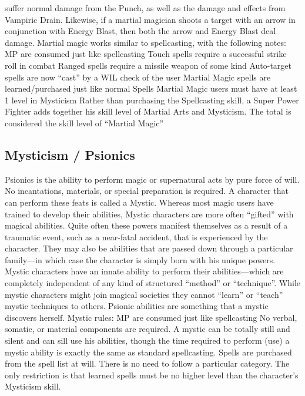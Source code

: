 \documentclass[twoside]{book}
\begin{document}
               suffer normal damage from the Punch, as well as the damage
               and effects from Vampiric Drain. Likewise, if a martial
               magician shoots a target with an arrow in conjunction with
               Energy Blast, then both the arrow and Energy Blast deal
               damage.   Martial magic works similar to spellcasting, with
               the following notes:   
                MP are consumed just like spellcasting   
                  Touch spells require a successful strike roll in
                 combat 
                  Ranged spells require a missile weapon of some
                 kind 
                  Auto-target spells are now “cast” by
                 a WIL check of the user 
                  Martial Magic spells are learned/purchased just
                 like normal Spells 
                  Martial Magic users must have at least 1 level in
                 Mysticism 
              Rather than purchasing the Spellcasting skill, a
               Super Power Fighter adds together his skill level of
               Martial Arts and Mysticism. The total is considered the
               skill level of “Martial Magic” 
\subsection{Mysticism / Psionics}
      Psionics is the ability to perform magic or
               supernatural acts by pure force of will. No incantations,
               materials, or special preparation is required. A character
               that can perform these feats is called a Mystic.   Whereas most magic users have trained to develop
               their abilities, Mystic characters are more often
               “gifted” with magical abilities. Quite often
               these powers manifest themselves as a result of a
               traumatic event, such as a near-fatal accident, that is
               experienced by the character. They may also be abilities
               that are passed down through a particular family—in
               which case the character is simply born with his unique
               powers. Mystic characters have an innate ability to
               perform their abilities—which are completely
               independent of any kind of structured “method”
               or “technique”. While mystic characters might
               join magical societies they cannot “learn” or
               “teach” mystic techniques to others. Psionic
               abilities are something that a mystic discovers herself.
                 Mystic rules:   
                MP are consumed just like spellcasting   
                  No verbal, somatic, or material components are
                 required. A mystic can be totally still and silent and
                 can sill use his abilities, though the time required to
                 perform (use) a mystic ability is exactly the same as
                 standard spellcasting. 
                  Spells are purchased from the spell list at will.
                 There is no need to follow a particular category. The
                 only restriction is that learned spells must be no
                 higher level than the character’s Mysticism skill.
                 
\end{document}
